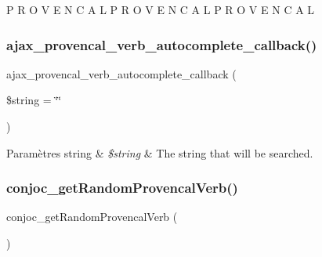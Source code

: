 P R O V E N C A L P R O V E N C A L P R O V E N C A L \hypertarget{conjoc__provencal__web_form_8inc_a2f2da1c5cc327e80252b73dd250aa363}{}\label{conjoc__provencal__web_form_8inc_a2f2da1c5cc327e80252b73dd250aa363} 
\subsubsection{\texorpdfstring{ajax\+\_\+provencal\+\_\+verb\+\_\+autocomplete\+\_\+callback()}{ajax\_provencal\_verb\_autocomplete\_callback()}}
{\footnotesize\ttfamily ajax\+\_\+provencal\+\_\+verb\+\_\+autocomplete\+\_\+callback (\begin{DoxyParamCaption}\item[{}]{\$string = {\ttfamily \char`\"{}\char`\"{}} }\end{DoxyParamCaption})}


\begin{DoxyParams}[1]{Paramètres}
string & {\em \$string} & The string that will be searched. \\
\hline
\end{DoxyParams}
\hypertarget{conjoc__provencal__web_form_8inc_a8e95bdf8c2d2a450e6485d589788aa83}{}\label{conjoc__provencal__web_form_8inc_a8e95bdf8c2d2a450e6485d589788aa83} 
\subsubsection{\texorpdfstring{conjoc\+\_\+get\+Random\+Provencal\+Verb()}{conjoc\_getRandomProvencalVerb()}}
{\footnotesize\ttfamily conjoc\+\_\+get\+Random\+Provencal\+Verb (\begin{DoxyParamCaption}{ }\end{DoxyParamCaption})}

